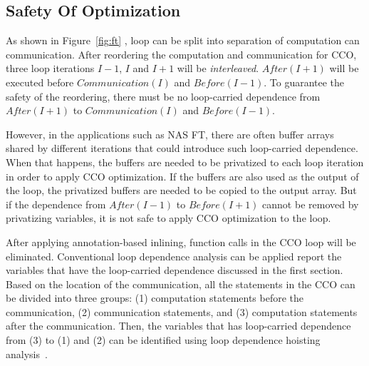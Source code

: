 
\subsection{Safety Of Optimization}
\label{sec:cco:safety}



As shown in Figure~\ref{fig:ft} , loop can be split into separation of computation can communication.
After reordering the computation and communication for CCO,
  three loop iterations $I-1$, $I$ and $I+1$ will be \emph{interleaved}.
$After(I+1)$ will be executed before $Communication(I)$ and $Before(I-1)$.
To guarantee the safety of the reordering, there must be no loop-carried dependence from
  $After(I+1)$ to $Communication(I)$ and $Before(I-1)$.

However, in the applications such as NAS FT,
  there are often buffer arrays shared by different iterations that could introduce such loop-carried dependence.
When that happens,
  the buffers are needed to be privatized to each loop iteration in order to apply CCO optimization.
If the buffers are also used as the output of the loop,
  the privatized buffers are needed to be copied to the output array.
But if the dependence from $After(I-1)$ to $Before(I+1)$ cannot be removed by privatizing variables,
  it is not safe to apply CCO optimization to the loop.

After applying annotation-based inlining, function calls in the CCO loop will be eliminated.
Conventional loop dependence analysis can be applied report the variables that have the loop-carried dependence discussed in the first section.
Based on the location of the communication,
   all the statements in the CCO can be divided into three groups:
   (1) computation statements before the communication,
   (2) communication statements,
   and (3) computation statements after the communication.
Then, the variables that has loop-carried dependence from (3) to (1) and (2) can be identified
  using loop dependence hoisting analysis~\cite{YKA:JSC04}.

